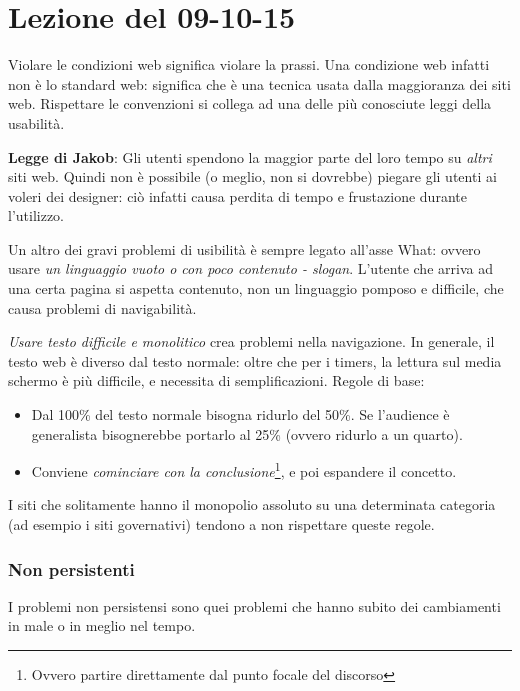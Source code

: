 \section{Lezione del 09-10-15}

Violare le condizioni web significa violare la prassi. Una condizione web infatti non \`e lo standard web: significa che \`e una tecnica usata dalla maggioranza dei siti web. Rispettare le convenzioni si collega ad una delle pi\`u conosciute leggi della usabilit\`a.

\textbf{Legge di Jakob}: Gli utenti spendono la maggior parte del loro tempo su \textit{altri} siti web. Quindi non \`e possibile (o meglio, non si dovrebbe) piegare gli utenti ai voleri dei designer: ci\`o infatti causa perdita di tempo e frustazione durante l'utilizzo.

Un altro dei gravi problemi di usibilit\`a \`e sempre legato all'asse What: ovvero usare \textit{un linguaggio vuoto o con poco contenuto - slogan}. L'utente che arriva ad una certa pagina si aspetta contenuto, non un linguaggio pomposo e difficile, che causa problemi di navigabilit\`a.

\textit{Usare testo difficile e monolitico} crea problemi nella navigazione. In generale, il testo web \`e diverso dal testo normale: oltre che per i timers, la lettura sul media schermo \`e pi\`u difficile, e necessita di semplificazioni. Regole di base:
\begin{itemize}

\item Dal 100\% del testo normale bisogna ridurlo del 50\%. Se l'audience \`e generalista bisognerebbe portarlo al 25\% (ovvero ridurlo a un quarto).

\item Conviene \textit{cominciare con la conclusione}\footnote{Ovvero partire direttamente dal punto focale del discorso}, e poi espandere il concetto.

\end{itemize}

I siti che solitamente hanno il monopolio assoluto su una determinata categoria (ad esempio i siti governativi) tendono a non rispettare queste regole.


\subsubsection{Non persistenti}

I problemi non persistensi sono quei problemi che hanno subito dei cambiamenti in male o in meglio nel tempo.

